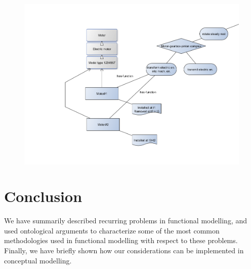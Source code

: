 \documentclass[
]{ceurart}
\begin{document}
\begin{figure}
  \centering
  \includegraphics[width=\textwidth]{functional-decomposition-with-replacement.png}
  \caption{\label{fig:replacement}}
\end{figure}

\section{Conclusion}
We have summarily described  recurring problems in functional modelling, and used ontological arguments to characterize some of the most common methodologies used in functional modelling with respect to these problems.
Finally, we have briefly shown how our considerations can be implemented in conceptual modelling.

\acknowledgments






\end{document}
